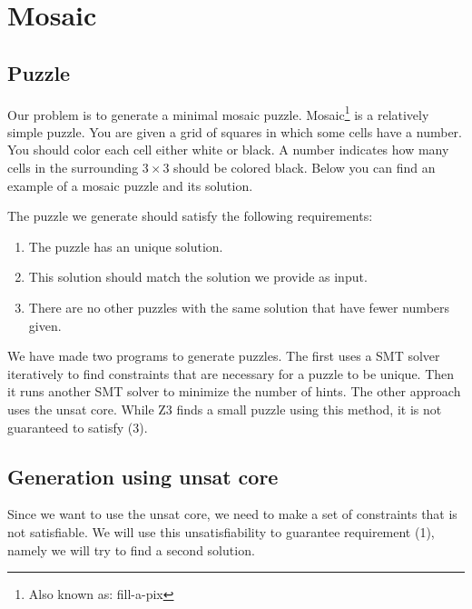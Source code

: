\documentclass{scrartcl}
\begin{document}


\pagebreak
\section{Mosaic} %
\label{sec:mosaic}
	\subsection{Puzzle} %
	\label{sub:puzzle}
	Our problem is to generate a minimal mosaic puzzle.
	Mosaic\footnote{Also known as: fill-a-pix} is a relatively simple puzzle.
	You are given a grid of squares in which some cells have a number.
	You should color each cell either white or black.
	A number indicates how many cells in the surrounding $3\times3$ should be colored black.
	Below you can find an example of a mosaic puzzle and its solution.

	\begin{figure}[H]
		\centering
		
	\end{figure}

	The puzzle we generate should satisfy the following requirements:
	\begin{enumerate}
		\item The puzzle has an unique solution.
		\item This solution should match the solution we provide as input.
		\item There are no other puzzles with the same solution that have fewer numbers given.
	\end{enumerate}

	We have made two programs to generate puzzles.
	The first uses a SMT solver iteratively to find constraints that are necessary for a puzzle to be unique. Then it runs another SMT solver to minimize the number of hints. The other approach uses the unsat core. While Z3 finds a small puzzle using this method, it is not guaranteed to satisfy (3).

	\subsection{Generation using unsat core} %
	\label{sub:mosaic_unsat_core}
	Since we want to use the unsat core, we need to make a set of constraints that is not satisfiable. We will use this unsatisfiability to guarantee requirement (1), namely we will try to find a second solution.
\end{document}
